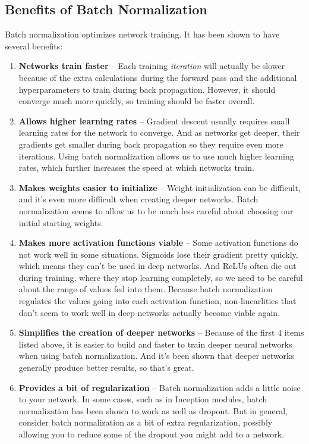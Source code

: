 \subsection{Benefits of Batch Normalization}
Batch normalization optimizes network training. It has been shown to have several benefits:
\begin{enumerate}
    \item \textbf{Networks train faster} – Each training \textit{iteration} will actually be slower because of the extra calculations during the forward pass and the additional hyperparameters to train during back propagation. However, it should converge much more quickly, so training should be faster overall.
    \item \textbf{Allows higher learning rates} – Gradient descent usually requires small learning rates for the network to converge. And as networks get deeper, their gradients get smaller during back propagation so they require even more iterations. Using batch normalization allows us to use much higher learning rates, which further increases the speed at which networks train.
    \item \textbf{Makes weights easier to initialize} – Weight initialization can be difficult, and it's even more difficult when creating deeper networks. Batch normalization seems to allow us to be much less careful about choosing our initial starting weights.
    \item \textbf{Makes more activation functions viable} – Some activation functions do not work well in some situations. Sigmoids lose their gradient pretty quickly, which means they can't be used in deep networks. And ReLUs often die out during training, where they stop learning completely, so we need to be careful about the range of values fed into them. Because batch normalization regulates the values going into each activation function, non-linearlities that don't seem to work well in deep networks actually become viable again.
    \item \textbf{Simplifies the creation of deeper networks} – Because of the first 4 items listed above, it is easier to build and faster to train deeper neural networks when using batch normalization. And it's been shown that deeper networks generally produce better results, so that's great.
    \item \textbf{Provides a bit of regularization} – Batch normalization adds a little noise to your network. In some cases, such as in Inception modules, batch normalization has been shown to work as well as dropout. But in general, consider batch normalization as a bit of extra regularization, possibly allowing you to reduce some of the dropout you might add to a network.

\end{enumerate}
